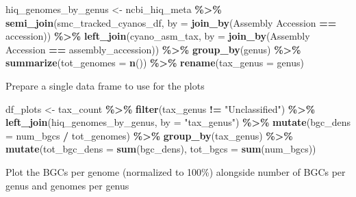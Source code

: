 \documentclass[
]{article}
\newenvironment{Shaded}{\begin{snugshade}}{\end{snugshade}}
\newcommand{\AttributeTok}[1]{\textcolor[rgb]{0.13,0.29,0.53}{#1}}
\newcommand{\FunctionTok}[1]{\textcolor[rgb]{0.13,0.29,0.53}{\textbf{#1}}}
\newcommand{\NormalTok}[1]{#1}
\newcommand{\OtherTok}[1]{\textcolor[rgb]{0.56,0.35,0.01}{#1}}
\newcommand{\SpecialCharTok}[1]{\textcolor[rgb]{0.81,0.36,0.00}{\textbf{#1}}}
\newcommand{\StringTok}[1]{\textcolor[rgb]{0.31,0.60,0.02}{#1}}
\begin{document}
\begin{Shaded}
\begin{Highlighting}[]
\NormalTok{hiq\_genomes\_by\_genus }\OtherTok{\textless{}{-}}\NormalTok{ ncbi\_hiq\_meta }\SpecialCharTok{\%\textgreater{}\%}
  \FunctionTok{semi\_join}\NormalTok{(smc\_tracked\_cyanos\_df, }\AttributeTok{by =} \FunctionTok{join\_by}\NormalTok{(}\StringTok{\textasciigrave{}}\AttributeTok{Assembly Accession}\StringTok{\textasciigrave{}} \SpecialCharTok{==}\NormalTok{ accession)) }\SpecialCharTok{\%\textgreater{}\%}
  \FunctionTok{left\_join}\NormalTok{(cyano\_asm\_tax, }\AttributeTok{by =} \FunctionTok{join\_by}\NormalTok{(}\StringTok{\textasciigrave{}}\AttributeTok{Assembly Accession}\StringTok{\textasciigrave{}} \SpecialCharTok{==}\NormalTok{ assembly\_accession)) }\SpecialCharTok{\%\textgreater{}\%}
  \FunctionTok{group\_by}\NormalTok{(genus) }\SpecialCharTok{\%\textgreater{}\%}
  \FunctionTok{summarize}\NormalTok{(}\AttributeTok{tot\_genomes =} \FunctionTok{n}\NormalTok{()) }\SpecialCharTok{\%\textgreater{}\%}
  \FunctionTok{rename}\NormalTok{(}\AttributeTok{tax\_genus =}\NormalTok{ genus)}
\end{Highlighting}
\end{Shaded}

Prepare a single data frame to use for the plots

\begin{Shaded}
\begin{Highlighting}[]
\NormalTok{df\_plots }\OtherTok{\textless{}{-}}\NormalTok{ tax\_count }\SpecialCharTok{\%\textgreater{}\%}
  \FunctionTok{filter}\NormalTok{(tax\_genus }\SpecialCharTok{!=} \StringTok{"Unclassified"}\NormalTok{) }\SpecialCharTok{\%\textgreater{}\%}
  \FunctionTok{left\_join}\NormalTok{(hiq\_genomes\_by\_genus, }\AttributeTok{by =} \StringTok{"tax\_genus"}\NormalTok{) }\SpecialCharTok{\%\textgreater{}\%}
  \FunctionTok{mutate}\NormalTok{(}\AttributeTok{bgc\_dens =}\NormalTok{ num\_bgcs }\SpecialCharTok{/}\NormalTok{ tot\_genomes) }\SpecialCharTok{\%\textgreater{}\%}
  \FunctionTok{group\_by}\NormalTok{(tax\_genus) }\SpecialCharTok{\%\textgreater{}\%}
  \FunctionTok{mutate}\NormalTok{(}\AttributeTok{tot\_bgc\_dens =} \FunctionTok{sum}\NormalTok{(bgc\_dens), }\AttributeTok{tot\_bgcs =} \FunctionTok{sum}\NormalTok{(num\_bgcs))}
\end{Highlighting}
\end{Shaded}

Plot the BGCs per genome (normalized to 100\%) alongside number of BGCs
per genus and genomes per genus
\end{document}
